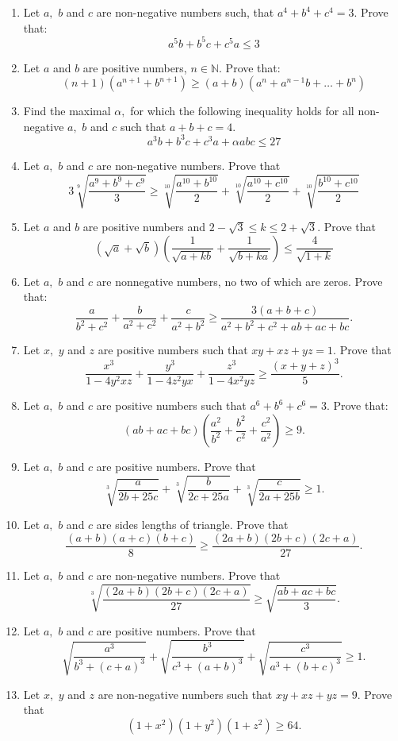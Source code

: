 \documentclass{article}
\begin{document}
\begin{enumerate}
\item  Let $ a,$ $ b$ and $ c$ are non-negative numbers such, that $ a^4+b^4+c^4=3.$ Prove that:
\[ a^5b+b^5c+c^5a\leq3\]

\item  Let $ a$ and $ b$ are positive numbers, $ n\in\mathbb N.$ Prove that:
\[ (n+1)(a^{n+1}+b^{n+1})\geq (a+b)(a^{n}+a^{n-1}b+ \dots +b^{n})\]

\item  Find the maximal $ \alpha,$ for which the following inequality holds for all non-negative $ a,$ $ b$ and $ c$ such that $ a + b + c = 4.$
\[a^3b + b^3c + c^3a + \alpha abc\leq27\]

\item  Let $ a,$ $ b$ and $ c$ are non-negative numbers. Prove that
\[ 3\sqrt[9]{\frac {a^9+b^9+c^9}{3}}\geq\sqrt[10]{\frac {a^{10}+b^{10}}{2}}+\sqrt[10]{\frac {a^{10}+c^{10}}{2}}+\sqrt[10]{\frac {b^{10}+c^{10}}{2}}\]

\item  Let $ a$ and $ b$ are positive numbers and $ 2-\sqrt3\leq k\leq2+\sqrt3.$ Prove that
\[ \left(\sqrt a+\sqrt b\right)\left(\frac {1}{\sqrt{a+kb}}+\frac {1}{\sqrt{b+ka}}\right)\leq\frac {4}{\sqrt{1+k}}\]

\item  Let $ a,$ $ b$ and $ c$ are nonnegative numbers,  no two of which are zeros. Prove that: 
\[\frac {a}{b^{2}+c^{2}}+\frac {b}{a^{2}+c^{2}}+\frac {c}{a^{2}+b^{2}}\ge\frac {3(a+b+c)}{a^{2}+b^{2}+c^{2}+ab+ac+bc}.\]

\item  Let $x,$ $y$ and $z$ are positive numbers such that $xy+xz+yz=1.$ Prove that
\[\frac {x^{3}}{1-4y^{2}xz}+\frac {y^{3}}{1-4z^{2}yx}+\frac {z^{3}}{1-4x^{2}yz}\ge \frac {(x+y+z)^{3}}{5}.\]

\item  Let $a,$ $b$ and $c$ are positive numbers such that $a^{6}+b^{6}+c^{6}=3.$ Prove that:
\[(ab+ac+bc)\left(\frac {a^{2}}{b^{2}}+\frac {b^{2}}{c^{2}}+\frac {c^{2}}{a^{2}}\right)\geq9.\]

\item  Let $a,$ $b$ and $c$ are positive numbers. Prove that
\[\sqrt[3]{\frac {a}{2b+25c}}+\sqrt[3]{\frac {b}{2c+25a}}+\sqrt[3]{\frac {c}{2a+25b}}\geq1.\]

\item  Let $a,$ $b$ and $c$ are  sides lengths of triangle. Prove that
\[\frac {(a+b)(a+c)(b+c)}{8}\geq\frac {(2a+b)(2b+c)(2c+a)}{27}.\]

\item  Let $a,$ $b$ and $c$ are non-negative numbers. Prove that
\[\sqrt[3]{\frac {(2a+b)(2b+c)(2c+a)}{27}}\geq\sqrt{\frac {ab+ac+bc}{3}}.\]

\item  Let $a,$ $b$ and $c$ are positive numbers. Prove that
\[\sqrt{\frac {a^{3}}{b^{3}+(c+a)^{3}}}+\sqrt{\frac {b^{3}}{c^{3}+(a+b)^{3}}}+\sqrt{\frac {c^{3}}{a^{3}+(b+c)^{3}}}\geq1.\]

\item  Let $x,$ $y$ and $z$ are non-negative numbers such that $xy+xz+yz=9.$ Prove that
\[(1+x^{2})(1+y^{2})(1+z^{2})\geq64.\]
\end{enumerate}
\end{document}
